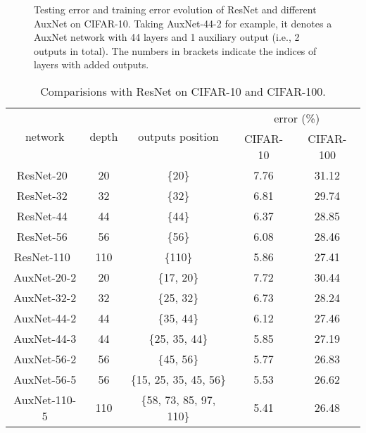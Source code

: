 \documentclass[10pt,onecolumn,letterpaper]{article}
\def\SexyName{AuxNet\xspace}
\begin{document}
\begin{figure}[t]
\centering
{}

\caption{Testing error and training error evolution of ResNet and different \SexyName on CIFAR-10. Taking \SexyName-44-2 for example, it denotes a \SexyName network with 44 layers and 1 auxiliary output (i.e., 2 outputs in total). The numbers in brackets indicate the indices of layers with added outputs.}
\label{fig:cifar}
\end{figure}

\begin{table}[t]
  \centering
  \caption{Comparisions with ResNet on CIFAR-10 and CIFAR-100.}
    \begin{tabular}{c|c|c|c|c}
    \hline
    \multirow{2}[0]{*}{network} & \multirow{2}[0]{*}{depth} & \multirow{2}[0]{*}{outputs position} & \multicolumn{2}{c}{error (\%)} \\
    \cline{4-5}
        &   &   & CIFAR-10 & CIFAR-100 \\
    \hline
    ResNet-20~\cite{he2016identity} & 20    & \{20\}  & 7.76 & 31.12 \\
    ResNet-32~\cite{he2016identity} & 32    & \{32\}  & 6.81 & 29.74 \\
    ResNet-44~\cite{he2016identity} & 44    & \{44\}  & 6.37 & 28.85 \\
    ResNet-56~\cite{he2016identity} & 56    & \{56\}  & 6.08 & 28.46 \\
    ResNet-110~\cite{he2016identity} & 110   & \{110\} & 5.86 & 27.41 \\
    \hline
    \SexyName-20-2 & 20    & \{17, 20\} & 7.72 & 30.44 \\
    \SexyName-32-2 & 32    & \{25, 32\} & 6.73 & 28.24 \\
    \SexyName-44-2 & 44    & \{35, 44\} & 6.12 & 27.46 \\
    \SexyName-44-3 & 44    & \{25, 35, 44\} & 5.85 & 27.19 \\
    \SexyName-56-2 & 56    & \{45, 56\} & 5.77 & 26.83 \\
    \SexyName-56-5 & 56    & \{15, 25, 35, 45, 56\} & 5.53 & 26.62 \\
    \SexyName-110-5 & 110   & \{58, 73, 85, 97, 110\}   &   5.41    &  26.48 \\
    \hline
    \end{tabular}
  \label{tab:cifar-resnet}%
\end{table}
\end{document}
